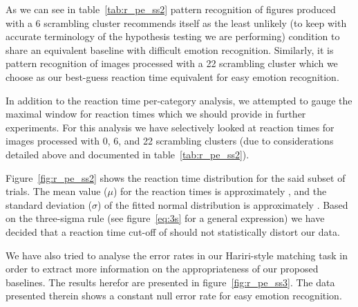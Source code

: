 	    As we can see in table~\ref{tab:r_pe_ss2} pattern recognition of figures produced with a \SI{6}{\pixel} scrambling cluster recommends itself as the least unlikely (to keep with accurate terminology of the hypothesis testing we are performing) condition to share an equivalent baseline with difficult emotion recognition.
	    Similarly, it is pattern recognition of images processed with a \SI{22}{\pixel} scrambling cluster which we choose as our best-guess reaction time equivalent for easy emotion recognition.
	    
	    In addition to the reaction time per-category analysis, we attempted to gauge the maximal window for reaction times which we should provide in further experiments.
	    For this analysis we have selectively looked at reaction times for images processed with \SI{0}{\pixel}, \SI{6}{\pixel}, and \SI{22}{\pixel} scrambling clusters (due to considerations detailed above and documented in table~\ref{tab:r_pe_ss2}).
	    
	    Figure~\ref{fig:r_pe_ss2} shows the reaction time distribution for the said subset of trials.
	    The mean value ($\mu$) for the reaction times is approximately , 
	    and the standard deviation ($\sigma$) of the fitted normal distribution is approximately .
	    Based on the three-sigma rule (see figure~\ref{eq:3s} for a general expression) we have decided that a reaction time cut-off of  should not statistically distort our data.
	    
	    We have also tried to analyse the error rates in our Hariri-style matching task in order to extract more information on the appropriateness of our proposed baselines.
	    The results herefor are presented in figure~\ref{fig:r_pe_ss3}.
	    The data presented therein shows a constant null error rate for easy emotion recognition.
	    	    
